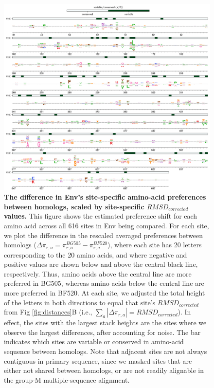\documentclass[9pt,lineno]{elife}
\begin{document}
\begin{figure}
\centerline{\includegraphics[width=6.5in]{figures/diffs_logo/diffs_logo.png}}
\caption{\label{fig:diffs_logo}
{\bf The difference in Env's site-specific amino-acid preferences between homologs, scaled by site-specific $RMSD_{corrected}$ values.}
This figure shows the estimated preference shift for each amino acid across all 616 sites in Env being compared.
For each site, we plot the difference in the rescaled averaged preferences between homologs ($\Delta\pi_{r,a} = \pi_{r,a}^{BG505} - \pi_{r,a}^{BF520}$), where each site has 20 letters corresponding to the 20 amino acids, and where negative and positive values are shown below and above the central black line, respectively.
Thus, amino acids above the central line are more preferred in BG505, whereas amino acids below the central line are more preferred in BF520.
At each site, we adjusted the total height of the letters in both directions to equal that site's $RMSD_{corrected}$ from Fig \ref{fig:distances}B (i.e., $\sum_{a}| \Delta\pi_{r,a} | = RMSD_{corrected}$).
In effect, the sites with the largest stack heights are the sites where we observe the largest differences, after accounting for noise.
The bar indicates which sites are variable or conserved in amino-acid sequence between homologs.
Note that adjacent sites are not always contiguous in primary sequence, since we masked sites that are either not shared between homologs, or are not readily alignable in the group-M multiple-sequence alignment.
}
\end{figure}
\end{document}
